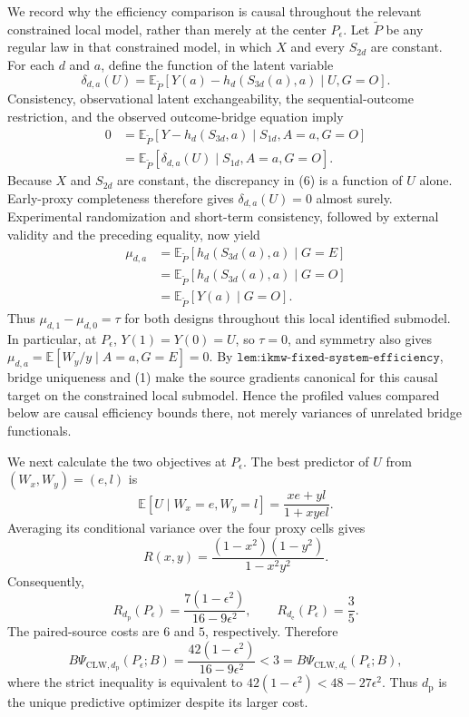 We record why the efficiency comparison is causal throughout the relevant constrained local model, rather than merely at the center \(P_\epsilon\).  Let \(\widetilde P\) be any regular law in that constrained model, in which \(X\) and every \(S_{2d}\) are constant.  For each \(d\) and \(a\), define the function of the latent variable
\[
 \delta_{d,a}(U)
 =\mathbb E_{\widetilde P}\!\left[
 Y(a)-h_d(S_{3d}(a),a)\mid U,G=O
 \right].
\]
Consistency, observational latent exchangeability, the sequential-outcome restriction, and the observed outcome-bridge equation imply
\[
 \begin{aligned}
 0
 &=\mathbb E_{\widetilde P}\!\left[
 Y-h_d(S_{3d},a)\mid S_{1d},A=a,G=O
 \right]\\
 &=\mathbb E_{\widetilde P}\!\left[
 \delta_{d,a}(U)\mid S_{1d},A=a,G=O
 \right].
 \end{aligned} \tag{6}
\]
Because \(X\) and \(S_{2d}\) are constant, the discrepancy in (6) is a function of \(U\) alone.  Early-proxy completeness therefore gives \(\delta_{d,a}(U)=0\) almost surely.  Experimental randomization and short-term consistency, followed by external validity and the preceding equality, now yield
\[
 \begin{aligned}
 \mu_{d,a}
 &=\mathbb E_{\widetilde P}[h_d(S_{3d}(a),a)\mid G=E]\\
 &=\mathbb E_{\widetilde P}[h_d(S_{3d}(a),a)\mid G=O]\\
 &=\mathbb E_{\widetilde P}[Y(a)\mid G=O].
 \end{aligned} \tag{7}
\]
Thus \(\mu_{d,1}-\mu_{d,0}=\tau\) for both designs throughout this local identified submodel.  In particular, at \(P_\epsilon\), \(Y(1)=Y(0)=U\), so \(\tau=0\), and symmetry also gives \(\mu_{d,a}=\mathbb E[W_y/y\mid A=a,G=E]=0\).  By \(\texttt{lem:ikmw-fixed-system-efficiency}\), bridge uniqueness and (1) make the source gradients canonical for this causal target on the constrained local submodel.  Hence the profiled values compared below are causal efficiency bounds there, not merely variances of unrelated bridge functionals.

We next calculate the two objectives at \(P_\epsilon\).  The best predictor of \(U\) from \((W_x,W_y)=(e,l)\) is
\[
 \mathbb E[U\mid W_x=e,W_y=l]
 =\frac{xe+yl}{1+xyel}.
\]
Averaging its conditional variance over the four proxy cells gives
\[
 R(x,y)=\frac{(1-x^2)(1-y^2)}{1-x^2y^2}. \tag{8}
\]
Consequently,
\[
 R_{d_{\mathrm p}}(P_\epsilon)
 =\frac{7(1-\epsilon^2)}{16-9\epsilon^2},
 \qquad
 R_{d_{\mathrm e}}(P_\epsilon)=\frac35. \tag{9}
\]
The paired-source costs are \(6\) and \(5\), respectively.  Therefore
\[
 B\Psi_{\mathrm{CLW},d_{\mathrm p}}(P_\epsilon;B)
 =\frac{42(1-\epsilon^2)}{16-9\epsilon^2}
 <3
 =B\Psi_{\mathrm{CLW},d_{\mathrm e}}(P_\epsilon;B), \tag{10}
\]
where the strict inequality is equivalent to \(42(1-\epsilon^2)<48-27\epsilon^2\).  Thus \(d_{\mathrm p}\) is the unique predictive optimizer despite its larger cost.

